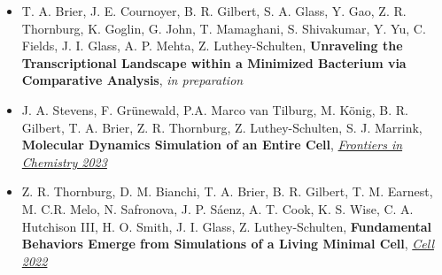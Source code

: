\documentclass[letterpaper,10pt]{article}
\begin{document}
\begin{itemize}[leftmargin=0.35in, label={}, labelindent=5pt,itemindent=-15pt]
  \setlength\itemsep{-0.4em}
  
\item \textcolor{color1}{T. A. Brier}, J. E. Cournoyer, B. R. Gilbert, S. A. Glass, Y. Gao, Z. R. Thornburg, K. Goglin, G. John, T. Mamaghani, S. Shivakumar,   Y. Yu, C. Fields, J. I. Glass, A. P. Mehta, Z. Luthey-Schulten, \textbf{Unraveling the Transcriptional Landscape within a Minimized Bacterium via Comparative Analysis}, \textit{in preparation}



\item J. A. Stevens, F. Gr\"{u}newald, P.A. Marco van Tilburg, M. K\"{o}nig, B. R. Gilbert, \textcolor{color1}{T. A. Brier}, Z. R. Thornburg, Z. Luthey-Schulten, S. J. Marrink, \textbf{Molecular Dynamics Simulation of an Entire Cell}, \href{https://doi.org/10.3389/fchem.2023.1106495}{\textit{Frontiers in Chemistry 2023}}%

\item Z. R. Thornburg, D. M. Bianchi, \textcolor{color1}{T. A. Brier}, B. R. Gilbert, T. M. Earnest, M. C.R. Melo, N. Safronova, J. P. S\'{a}enz, A. T. Cook, K. S. Wise, C. A. Hutchison III, H. O. Smith, J. I. Glass, Z. Luthey-Schulten, \textbf{Fundamental Behaviors Emerge from Simulations of a Living Minimal Cell}, \href{https://doi.org/10.1016/j.cell.2021.12.025}{\textit{Cell 2022}}%


\end{itemize}
\end{document}
